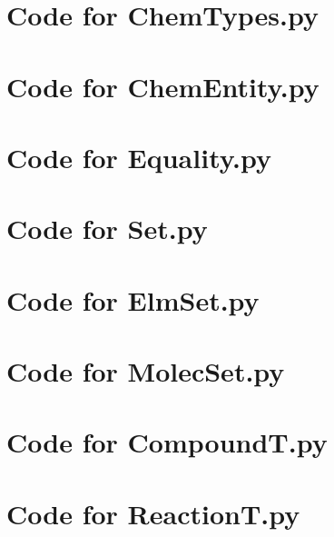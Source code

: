 \documentclass[12pt]{article}
\begin{document}
\section{Code for ChemTypes.py}

\noindent 

\newpage

\section{Code for ChemEntity.py}

\noindent 

\newpage

\section{Code for Equality.py}

\noindent 

\newpage

\section{Code for Set.py}

\noindent 

\newpage

\section{Code for ElmSet.py}

\noindent 

\newpage

\section{Code for MolecSet.py}

\noindent 

\newpage

\section{Code for CompoundT.py}

\noindent 

\newpage

\section{Code for ReactionT.py}
\end{document}
